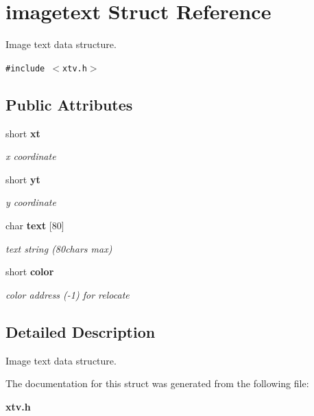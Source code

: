 \section{imagetext Struct Reference}
\label{structimagetext}
Image text data structure.  


{\tt \#include $<$xtv.h$>$}

\subsection*{Public Attributes}
\begin{CompactItemize}
\item 
short {\bf xt}\label{structimagetext_o0}

\begin{CompactList}\small\item\em x coordinate \item\end{CompactList}\item 
short {\bf yt}\label{structimagetext_o1}

\begin{CompactList}\small\item\em y coordinate \item\end{CompactList}\item 
char {\bf text} [80]\label{structimagetext_o2}

\begin{CompactList}\small\item\em text string (80chars max) \item\end{CompactList}\item 
short {\bf color}\label{structimagetext_o3}

\begin{CompactList}\small\item\em color address (-1) for relocate \item\end{CompactList}\end{CompactItemize}


\subsection{Detailed Description}
Image text data structure. 



The documentation for this struct was generated from the following file:\begin{CompactItemize}
\item 
{\bf xtv.h}\end{CompactItemize}
